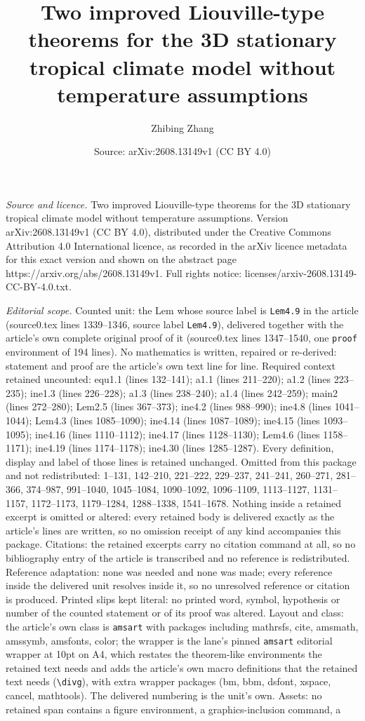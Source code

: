 \documentclass[10pt,a4paper]{amsart}
\title[Two improved Liouville-type theorems for the 3D stationary t]{Two improved Liouville-type theorems for the 3D stationary tropical climate model without temperature assumptions}
\author{Zhibing Zhang}
\date{Source: arXiv:2608.13149v1 (CC BY 4.0)}
\begin{document}
\maketitle

\noindent\emph{Source and licence.} Two improved Liouville-type theorems for the 3D stationary tropical climate model without temperature assumptions. Version arXiv:2608.13149v1 (CC BY 4.0), distributed under the Creative Commons Attribution 4.0 International licence, as recorded in the arXiv licence metadata for this exact version and shown on the abstract page https://arxiv.org/abs/2608.13149v1. Full rights notice: licenses/arxiv-2608.13149-CC-BY-4.0.txt.\par\smallskip

\noindent\textit{Editorial scope.} Counted unit: the Lem whose source label is \texttt{Lem4.9} in the article (source0.tex lines 1339--1346, source label \texttt{Lem4.9}), delivered together with the article's own complete original proof of it (source0.tex lines 1347--1540, one \texttt{proof} environment of 194 lines). No mathematics is written, repaired or re-derived: statement and proof are the article's own text line for line. Required context retained uncounted: equ1.1 (lines 132--141); a1.1 (lines 211--220); a1.2 (lines 223--235); ine1.3 (lines 226--228); a1.3 (lines 238--240); a1.4 (lines 242--259); main2 (lines 272--280); Lem2.5 (lines 367--373); ine4.2 (lines 988--990); ine4.8 (lines 1041--1044); Lem4.3 (lines 1085--1090); ine4.14 (lines 1087--1089); ine4.15 (lines 1093--1095); ine4.16 (lines 1110--1112); ine4.17 (lines 1128--1130); Lem4.6 (lines 1158--1171); ine4.19 (lines 1174--1178); ine4.30 (lines 1285--1287). Every definition, display and label of those lines is retained unchanged. Omitted from this package and not redistributed: 1--131, 142--210, 221--222, 229--237, 241--241, 260--271, 281--366, 374--987, 991--1040, 1045--1084, 1090--1092, 1096--1109, 1113--1127, 1131--1157, 1172--1173, 1179--1284, 1288--1338, 1541--1678. Nothing inside a retained excerpt is omitted or altered: every retained body is delivered exactly as the article's lines are written, so no omission receipt of any kind accompanies this package. Citations: the retained excerpts carry no citation command at all, so no bibliography entry of the article is transcribed and no reference is redistributed. Reference adaptation: none was needed and none was made; every reference inside the delivered unit resolves inside it, so no unresolved reference or citation is produced. Printed slips kept literal: no printed word, symbol, hypothesis or number of the counted statement or of its proof was altered. Layout and class: the article's own class is \texttt{amsart} with packages including mathrsfs, cite, amsmath, amssymb, amsfonts, color; the wrapper is the lane's pinned \texttt{amsart} editorial wrapper at 10pt on A4, which restates the theorem-like environments the retained text needs and adds the article's own macro definitions that the retained text needs (\texttt{\textbackslash divg}), with extra wrapper packages (bm, bbm, dsfont, xspace, cancel, mathtools). The delivered numbering is the unit's own. Assets: no retained span contains a figure environment, a graphics-inclusion command, a 
\end{document}
